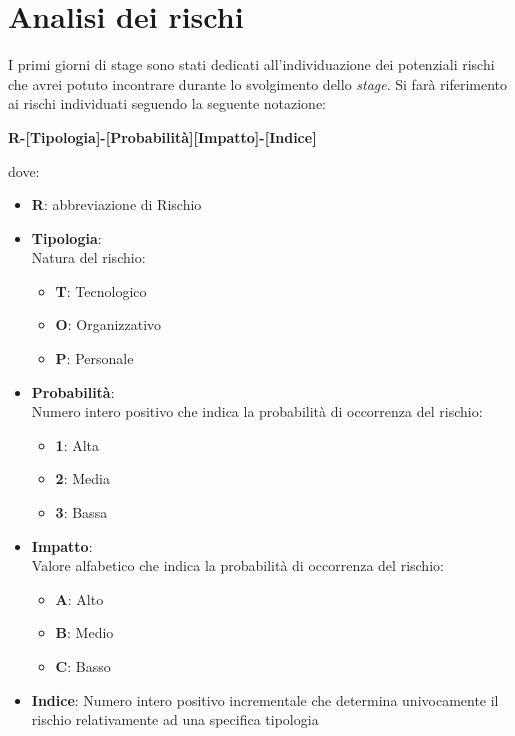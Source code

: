 \section{Analisi dei rischi} \label{sec:rischi}
I primi giorni di stage sono stati dedicati all'individuazione dei potenziali rischi che avrei potuto incontrare durante lo svolgimento dello \textit{stage}.
Si farà riferimento ai rischi individuati seguendo la seguente notazione: 
\begin{center}
    \textbf{R-[Tipologia]-[Probabilità][Impatto]-[Indice]}
\end{center}
dove:
\begin{itemize}
    \item \textbf{R}: abbreviazione di Rischio
    \item \textbf{Tipologia}: \\ Natura del rischio: \begin{itemize}
        \item \textbf{T}: Tecnologico
        \item \textbf{O}: Organizzativo
        \item \textbf{P}: Personale
    \end{itemize}
    \item \textbf{Probabilità}: \\ Numero intero positivo che indica la probabilità di occorrenza del rischio: \begin{itemize}
        \item \textbf{1}: Alta
        \item \textbf{2}: Media
        \item \textbf{3}: Bassa
    \end{itemize}
    \item \textbf{Impatto}: \\ Valore alfabetico che indica la probabilità di occorrenza del rischio: \begin{itemize}
        \item \textbf{A}: Alto
        \item \textbf{B}: Medio
        \item \textbf{C}: Basso
    \end{itemize}
    \item \textbf{Indice}: Numero intero positivo incrementale che determina univocamente il rischio relativamente ad una specifica tipologia
\end{itemize}

